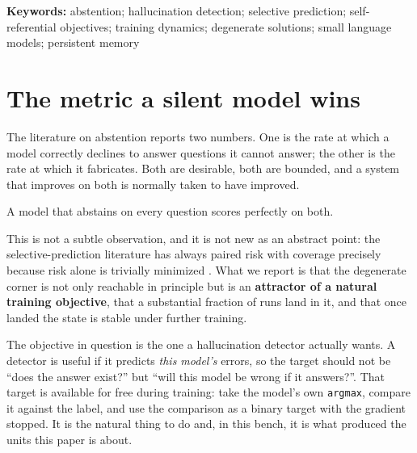 \documentclass[11pt]{article}
\begin{document}
\begin{abstract}
The degenerate point is \textbf{absorbing}, not merely slow. Measuring recovery inside one unit with
paired samples across $4000$ further steps gives $-0.0021$, or $0.4\sigma$: it does not move. We
also report a correction to our own first reading, in which a between-unit trend that survives a
noise control ($r = 0.986$) was nonetheless not extrapolable, because the curve is concave and a
linear fit hid a saturation.

The practical consequence is a metric claim, not an architectural one: \textbf{any success criterion
that reads abstention rate and fabrication rate without reading global accuracy is maximized by a
model that has learned nothing}, and a self-referential objective supplies a training dynamic that
reaches that maximum on its own, in a substantial fraction of runs, with no warning from either
metric.
\end{abstract}

\vspace{0.5em}
\noindent\textbf{Keywords:} abstention; hallucination detection; selective prediction; self-referential
objectives; training dynamics; degenerate solutions; small language models; persistent memory

\section{The metric a silent model wins}
\label{sec:intro}

The literature on abstention reports two numbers. One is the rate at which a model correctly declines
to answer questions it cannot answer; the other is the rate at which it fabricates. Both are
desirable, both are bounded, and a system that improves on both is normally taken to have improved.

A model that abstains on every question scores perfectly on both.

This is not a subtle observation, and it is not new as an abstract point: the selective-prediction
literature has always paired risk with coverage precisely because risk alone is trivially minimized
\citep{elyaniv2010selective, geifman2017selective}. What we report is that the degenerate corner is
not only reachable in principle but is an \textbf{attractor of a natural training objective}, that a
substantial fraction of runs land in it, and that once landed the state is stable under further
training.

The objective in question is the one a hallucination detector actually wants. A detector is useful if
it predicts \emph{this model's} errors, so the target should not be ``does the answer exist?'' but
``will this model be wrong if it answers?''. That target is available for free during training: take
the model's own \texttt{argmax}, compare it against the label, and use the comparison as a binary
target with the gradient stopped. It is the natural thing to do and, in this bench, it is what
produced the units this paper is about.
\end{document}
